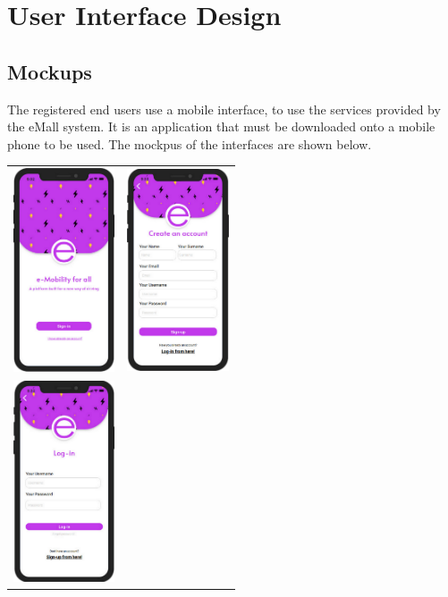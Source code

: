 \chapter{User Interface Design}
\section{Mockups}
The registered end users use a mobile interface, to use the services provided by the eMall system. It is an application that must be downloaded onto a mobile phone to be used. The mockpus of the interfaces are shown below.
\begin{table}[H]
\centering
\begin{tabu}to \textwidth {X[c]X[c]}
  \includegraphics[width=30mm]{images/home.png}\label{fig:homePageeMSP} &
  \includegraphics[width=30mm]{images/signup.png}\label{fig:signUpPage} \\
  \includegraphics[width=30mm]{images/login.png}\label{fig:logInPage} &

\end{tabu}
\end{table}
